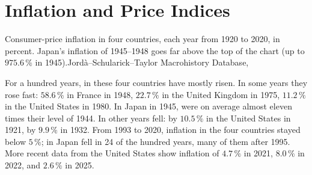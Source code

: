\chapter{Inflation and Price Indices}\label{ch:g8:inflation-and-price-indices}

\begin{openingchart}{Consumer-price inflation in four countries, each year from 1920 to 2020,
in percent. Japan's inflation of 1945--1948 goes far above the top of the chart (up to $975.6\,\%$
in 1945).}{Jord\`a--Schularick--Taylor Macrohistory Database, }
\end{openingchart}

For a hundred years,  in these four countries have mostly risen. In some years they rose
fast: $58.6\,\%$ in France in 1948, $22.7\,\%$ in the United Kingdom in 1975, $11.2\,\%$ in the United
States in 1980. In Japan in 1945,  were on average almost eleven times their level of
1944. In other years  fell: by $10.5\,\%$ in the United States in 1921, by $9.9\,\%$
in 1932. From 1993 to 2020, inflation in the four countries stayed below $5\,\%$;  in
Japan fell in 24 of the hundred years, many of them after 1995. More recent data from the United
States show inflation of $4.7\,\%$ in 2021, $8.0\,\%$ in 2022, and $2.6\,\%$ in 2025.

